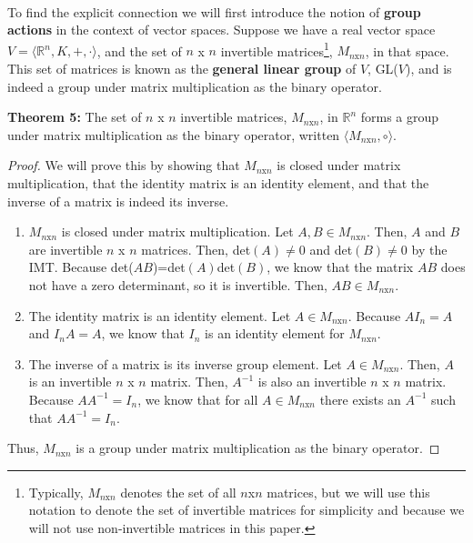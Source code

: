 \documentclass[twoside]{article}
\newcommand{\R}{\mathbb{R}}
\newcommand{\done}{\renewcommand\qedsymbol{$\blacksquare$}}
\begin{document}
\begin{spacing}{1.25}
\paragraph*{} To find the explicit connection we will first introduce the notion of 
\textbf{group actions} in the context of vector spaces. Suppose we have a real vector space 
$V=\langle \R^n,K,+,\cdot\rangle$, and the 
set of $n$ x $n$ invertible matrices\footnote[5]{Typically, $M_{n\text{x}n}$ denotes the set of all $n$x$n$ matrices, but we will
use this notation to denote the set of invertible matrices for simplicity 
and because we will not use non-invertible matrices in this paper.
}, $M_{n\text{x}n}$, in that space.
This set of matrices is known as the \textbf{general linear group} of $V$, GL($V$),
and is indeed a group under matrix multiplication as the binary operator.
\begin{mdframed}[roundcorner=10pt, backgroundcolor=gray!10]
  \textbf{Theorem 5:} The set of $n$ x $n$ invertible matrices, $M_{n\text{x}n}$, in
  $\R^n$ forms a group under matrix multiplication as the binary operator, written 
  $\langle M_{n\text{x}n}, \circ\rangle$.
\end{mdframed}
\begin{proof}
  We will prove this by showing that $M_{n\text{x}n}$ is closed under matrix multiplication, 
  that the identity matrix is an identity element, and that the inverse of a matrix is 
  indeed its inverse. 
  \begin{enumerate}
    \item $M_{n\text{x}n}$ is closed under matrix multiplication. 
    Let $A,B\in M_{n\text{x}n}$. Then, $A$ and $B$ are invertible $n$ x $n$ matrices. 
    Then, det$(A) \neq 0$ and det$(B) \neq 0$ by the IMT. Because det($AB$)=det$(A)$det$(B)$,
    we know that the matrix $AB$ does not have a zero determinant, so it is invertible.
    Then, $AB\in M_{n\text{x}n}$.

    \item The identity matrix is an identity element. 
    Let $A\in M_{n\text{x}n}$. Because $AI_n=A$ and $I_nA=A$, we know that $I_n$
    is an identity element for $M_{n\text{x}n}$. 

    \item The inverse of a matrix is its inverse group element.  
    Let $A\in M_{n\text{x}n}$. Then, $A$ is an invertible $n$ x $n$ matrix. 
    Then, $A^{-1}$ is also an invertible $n$ x $n$ matrix. Because $AA^{-1}=I_n$,
    we know that for all $A\in M_{n\text{x}n}$ there exists an $A^{-1}$ such that $AA^{-1}=I_n$.
  \end{enumerate}
  Thus, $M_{n\text{x}n}$ is a group under matrix multiplication as the binary operator.
\done 
\end{proof}


\end{spacing}
\end{document}
